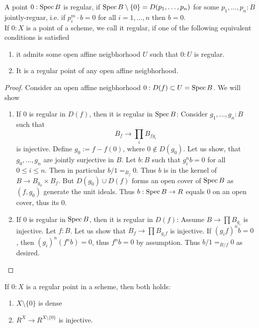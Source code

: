\documentclass{article}
\begin{document}
\begin{definition}
	A point $0 : \operatorname{Spec} B$ is regular, if $\operatorname{Spec} B \setminus \{0\} = D(p_1,\hdots,p_n)$ for some $p_1,\hdots,p_n : B$ jointly-reguar, i.e. if $p_i^m \cdot b = 0$ for all $i=1,\hdots,n$ then $b = 0$. \\
	If $0 : X$ is a point of a scheme, we call it regular, if one of the following equivalent conditions is satisfied 
	\begin{enumerate}
		\item it admits some open affine neigbhorhood $U$ such that $0 : U$ is regular.\\
		\item It is a regular point of any open affine neigbhorhood.
	\end{enumerate}
\end{definition}
\begin{proof}
	Consider an open affine neigbhorhood $0 : D(f) \subset U = \operatorname{Spec} B$.
	We will show
	\begin{enumerate}
		\item If $0$ is regular in $D(f)$, then it is regular in $\operatorname{Spec} B$:
		Consider $g_1, \hdots, g_n : B$ such that 
		\[
		B_f \to \prod_i B_{f g_i}
		\]
		is injective. Define $g_0 := f - f(0)$, where $0 \not \in D(g_0)$.
		Let us show, that $g_0,\hdots,g_n$ are jointly surjective in $B$.
		Let $b : B$ such that $g_i^n b = 0$ for all $0 \le i \le n$. Then in particular $b / 1 =_{B_f} 0$. Thus $b$ is in the kernel of $B \to B_{g_0} \times B_f$. But $D(g_0) \cup D(f)$ forms an open cover of $\operatorname{Spec} B$ as $(f,g_0)$ generate the unit ideals. Thus $b : \operatorname{Spec} B \to R$ equals 0 on an open cover, thus its 0.
		\item If $0$ is regular in $\operatorname{Spec} B$, then it is regular in $D(f)$:
		Assume $B \to \prod B_{g_i}$ is injective. Let $f : B$. Let us show that $B_f \to \prod B_{g_i f}$ is injective. If $(g_i f)^n b = 0$, then $(g_i)^n (f^n b) = 0$, thus $f^n b = 0$ by assumption. Thus $b / 1 =_{B /f} 0$ as desired.
	\end{enumerate}
\end{proof}
\begin{lemma}{\label{lemma:AlmostEverywhere}}
	If $0 : X$ is a regular point in a scheme, then both holds:
	\begin{enumerate}
		\item $X \setminus \{0\}$ is dense
		\item $R^X \to R^{X \setminus \{0\}}$ is injective. %
	\end{enumerate}
\end{lemma}
\end{document}
